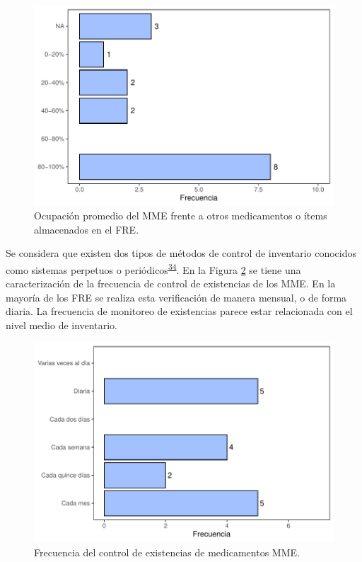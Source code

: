\documentclass[
  oneside]{book}
\begin{document}
\begin{figure}[!b]

{\centering \includegraphics[width=0.85\linewidth]{InformeFinal_files/figure-latex/PropOcupacionAlmacen-1} 

}

\caption{Ocupación promedio del MME frente a otros medicamentos o ítems almacenados en el FRE.}\label{fig:PropOcupacionAlmacen}
\end{figure}

Se considera que existen dos tipos de métodos de control de inventario conocidos como sistemas perpetuos o periódicos\textsuperscript{\protect\hyperlink{ref-Silver2017}{34}}.
En la Figura \ref{fig:FrecControlExistencias} se tiene una caracterización de la frecuencia de control de existencias de los MME. En la mayoría de los FRE se realiza esta verificación de manera mensual, o de forma diaria. La frecuencia de monitoreo de existencias parece estar relacionada con el nivel medio de inventario.

\begin{figure}

{\centering \includegraphics[width=1\linewidth]{InformeFinal_files/figure-latex/FrecControlExistencias-1} 

}

\caption{Frecuencia del control de existencias de medicamentos MME.}\label{fig:FrecControlExistencias}
\end{figure}
\end{document}
